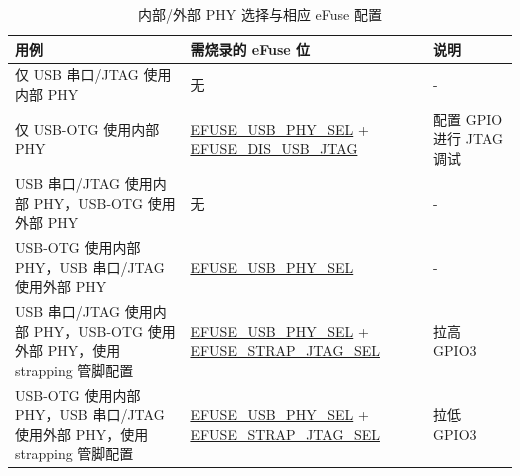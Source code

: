 \begin{table}[H]
    \centering
    \caption{内部/外部 PHY 选择与相应 eFuse 配置}
    \label{tab:usbserialjtag-efuse-setting}
    \begin{tabular} {|p{8cm}|p{4cm}|p{3cm}|}
    \hline
        \rowcolor{lightgray}
        \textbf{用例} & \textbf{需烧录的 eFuse 位} & \textbf{说明} \\\hline
        
        仅 USB 串口/JTAG 使用内部 PHY  & 无 & - \\\hline
        仅 USB-OTG 使用内部 PHY  & \hyperref[fielddesc:EFUSEUSBPHYSEL]{EFUSE\_USB\_PHY\_SEL} + \hyperref[fielddesc:EFUSEDISUSBJTAG]{EFUSE\_DIS\_USB\_JTAG} & 配置 GPIO 进行 JTAG 调试 \\\hline
        USB 串口/JTAG 使用内部 PHY，USB-OTG 使用外部 PHY & 无 & - \\\hline
        USB-OTG 使用内部 PHY，USB 串口/JTAG 使用外部 PHY & \hyperref[fielddesc:EFUSEUSBPHYSEL]{EFUSE\_USB\_PHY\_SEL} & -\\\hline
        USB 串口/JTAG 使用内部 PHY，USB-OTG 使用外部 PHY，使用 strapping 管脚配置 & \hyperref[fielddesc:EFUSEUSBPHYSEL]{EFUSE\_USB\_PHY\_SEL} + \hyperref[fielddesc:EFUSESTRAPJTAGSEL]{EFUSE\_STRAP\_JTAG\_SEL} & 拉高 GPIO3 \\\hline
        USB-OTG 使用内部 PHY，USB 串口/JTAG 使用外部 PHY，使用 strapping 管脚配置 & \hyperref[fielddesc:EFUSEUSBPHYSEL]{EFUSE\_USB\_PHY\_SEL} + \hyperref[fielddesc:EFUSESTRAPJTAGSEL]{EFUSE\_STRAP\_JTAG\_SEL} & 拉低 GPIO3 \\\hline
    \end{tabular}
\end{table}